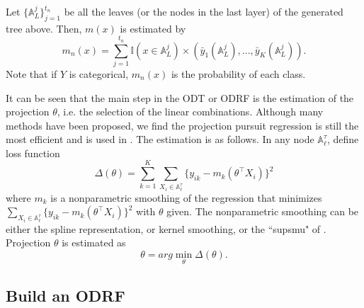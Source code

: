 \documentclass[nojss]{jss}
\numberwithin{equation}{section}
\begin{document}
Let $\{\mathbb{A}_L^j\}_{j=1}^{t_n}$ be all the leaves (or the nodes in the last layer) of the generated tree above. Then, $m(x)$ is estimated by
$$m_{n}(x)=\sum_{j=1}^{t_n}\mathbb{I}(x\in \mathbb{A}_L^j)\times  (\bar y_1(\mathbb{A}_L^j), ..., \bar y_K(\mathbb{A}_L^j)).$$
Note that if $ Y$ is categorical,  $ m_{n}(x) $ is the probability of each class.


It can be seen that the main step in the ODT or ODRF is the estimation of the projection $ \theta $, i.e. the selection of the linear combinations. Although many methods have been proposed, we find the projection pursuit regression \cite{friedman1981projection} is still the most efficient and is used in . The estimation is as follows. In any node $ \mathbb{A}_\ell^\tau $, define loss function
$$
 \Delta(\theta) =  \sum_{k=1}^K \sum_{X_i \in \mathbb{A}_\ell^\tau} \Big\{y_{ik} - m_k(\theta^\top X_i)\Big\}^2
$$
where  $ m_k $ is a nonparametric smoothing of the regression that minimizes  $\sum_{X_i \in \mathbb{A}_\ell^\tau} \Big\{y_{ik} - m_k(\theta^\top X_i)\Big\}^2$ with $ \theta $ given.  The nonparametric smoothing can be either the spline representation, or kernel smoothing, or the ``supsmu" of . Projection $ \theta $ is estimated as
$$
\theta = arg \min_\theta \Delta(\theta).
$$




\subsection{Build an ODRF }
\end{document}
